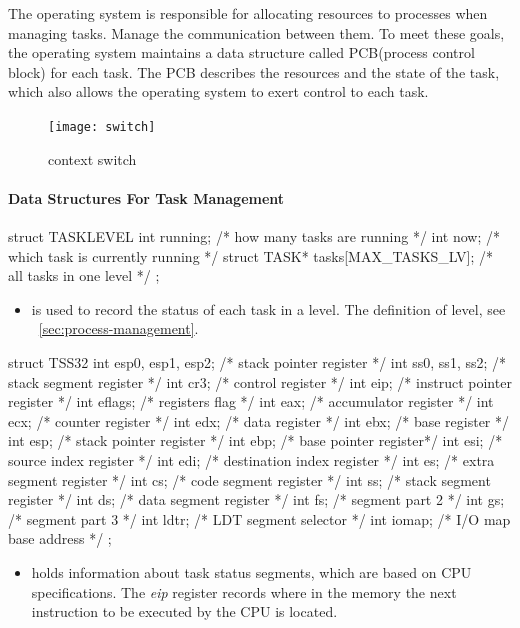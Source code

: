 \documentclass{swfcthesis}
\begin{document}
The operating system is responsible for allocating resources to processes when managing
tasks. Manage the communication between them. To meet these goals, the operating system
maintains a data structure called PCB(process control block) for each task. The PCB
describes the resources and the state of the task, which also allows the operating system to
exert control to each task.



\begin{figure}
  \centering
  \begin{center}
    \texttt{[image: switch]}
  \end{center}
  \caption{context switch}
  \label{fig:ctxt-switch}
\end{figure}

\paragraph{Data Structures For Task Management}

\begin{codeblock}[1]
\begin{ccode}
struct TASKLEVEL
{ 
  int running; /* how many tasks are running */
  int now;     /* which task is currently running */
  struct TASK* tasks[MAX_TASKS_LV]; /* all tasks in one level */
};
\end{ccode}
\end{codeblock}
\begin{itemize}
\item is used to record the status of each task in a level. The definition of level, see
  ~\ref{sec:process-management}.
  
  
\end{itemize}

\begin{codeblock}[1]
\begin{ccode}
struct TSS32
{ 
  int esp0, esp1, esp2; /* stack pointer register */
  int ss0, ss1, ss2;    /* stack segment register */
  int cr3;    /* control register */
  int eip;    /* instruct pointer register */
  int eflags; /* registers flag */
  int eax;    /* accumulator register */
  int ecx;    /* counter register */
  int edx;    /* data register */
  int ebx;    /* base register */
  int esp;    /* stack pointer register */
  int ebp;    /* base pointer register*/
  int esi;    /* source index register */
  int edi;    /* destination index register */
  int es;     /* extra segment register */
  int cs;     /* code segment register */
  int ss;     /* stack segment register */
  int ds;     /* data segment register */
  int fs;     /* segment part 2 */
  int gs;     /* segment part 3 */
  int ldtr;   /* LDT segment selector */
  int iomap;  /* I/O map base address */
};
\end{ccode}
\end{codeblock}
\begin{itemize}
\item holds information about task status segments, which are based on CPU
  specifications\cite[Sec.6.2.1]{intel_3a}. The \emph{eip} register records where in the
  memory the next instruction to be executed by the CPU is located.
\end{itemize}
\end{document}

